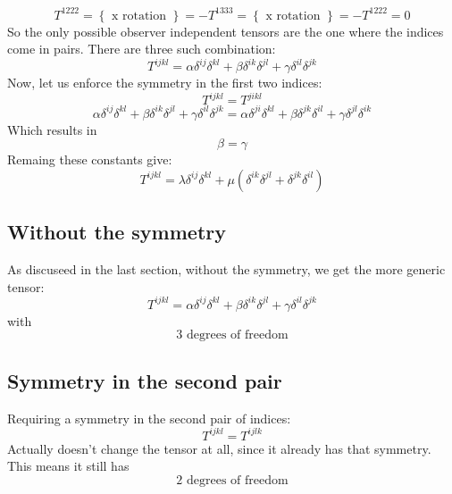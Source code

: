 \documentclass{article}
\begin{document}
\begin{equation}
    T^{1222} = \left\{\text{ x rotation }\right\} = -T^{1333} = \left\{\text{ x rotation }\right\} = -T^{1222} = 0
\end{equation}
So the only possible observer independent tensors are the one where the indices come in pairs. There are three such combination:
\begin{equation}
    T^{ijkl} = \alpha \delta^{ij}\delta^{kl} + \beta \delta^{ik}\delta^{jl} + \gamma \delta^{il}\delta^{jk}
\end{equation}
Now, let us enforce the symmetry in the first two indices:
\begin{equation}
    T^{ijkl} = T^{jikl}
\end{equation}
\begin{equation}
    \alpha \delta^{ij}\delta^{kl} + \beta \delta^{ik}\delta^{jl} + \gamma \delta^{il}\delta^{jk} =
    \alpha \delta^{ji}\delta^{kl} + \beta \delta^{jk}\delta^{il} + \gamma \delta^{jl}\delta^{ik}
\end{equation}
Which results in
\begin{equation}
    \beta = \gamma
\end{equation}
Remaing these constants give:
\begin{equation}
    \boxed{T^{ijkl} = \lambda \delta^{ij}\delta^{kl} + \mu(\delta^{ik}\delta^{jl} + \delta^{jk}\delta^{il})}
\end{equation}
\subsection{Without the symmetry}
As discuseed in the last section, without the symmetry, we get the more generic tensor:
\begin{equation}
    T^{ijkl} = \alpha \delta^{ij}\delta^{kl} + \beta \delta^{ik}\delta^{jl} + \gamma \delta^{il}\delta^{jk}
\end{equation}
with
\begin{equation}
    \boxed{\text{3 degrees of freedom}}
\end{equation}
\subsection{Symmetry in the second pair}
Requiring a symmetry in the second pair of indices:
\begin{equation}
    T^{ijkl} = T^{ijlk}
\end{equation}
Actually doesn't change the tensor at all, since it already has that symmetry. This means it still has
\begin{equation}
    \boxed{\text{2 degrees of freedom}}
\end{equation}
\end{document}
